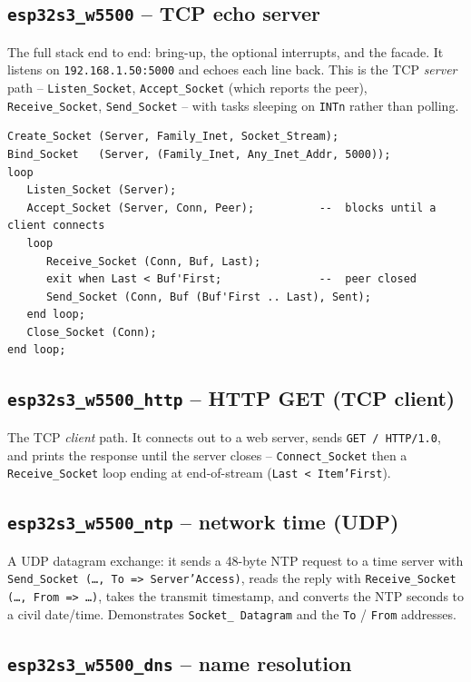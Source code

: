 \subsection{\texttt{esp32s3\_w5500} -- TCP echo server}

The full stack end to end: bring-up, the optional interrupts, and the facade. It
listens on \texttt{192.168.1.50:5000} and echoes each line back. This is the TCP
\emph{server} path -- \texttt{Listen\_Socket}, \texttt{Accept\_Socket} (which
reports the peer), \texttt{Receive\_Socket}, \texttt{Send\_Socket} -- with tasks
sleeping on \texttt{INTn} rather than polling.

\begin{lstlisting}
Create_Socket (Server, Family_Inet, Socket_Stream);
Bind_Socket   (Server, (Family_Inet, Any_Inet_Addr, 5000));
loop
   Listen_Socket (Server);
   Accept_Socket (Server, Conn, Peer);          --  blocks until a client connects
   loop
      Receive_Socket (Conn, Buf, Last);
      exit when Last < Buf'First;               --  peer closed
      Send_Socket (Conn, Buf (Buf'First .. Last), Sent);
   end loop;
   Close_Socket (Conn);
end loop;
\end{lstlisting}

\subsection{\texttt{esp32s3\_w5500\_http} -- HTTP GET (TCP client)}

The TCP \emph{client} path. It connects out to a web server, sends
\texttt{GET / HTTP/1.0}, and prints the response until the server closes --
\texttt{Connect\_Socket} then a \texttt{Receive\_Socket} loop ending at
end-of-stream (\texttt{Last < Item'First}).

\subsection{\texttt{esp32s3\_w5500\_ntp} -- network time (UDP)}

A UDP datagram exchange: it sends a 48-byte NTP request to a time server with
\texttt{Send\_Socket (\dots, To => Server'Access)}, reads the reply with
\texttt{Receive\_Socket (\dots, From => \dots)}, takes the transmit timestamp, and
converts the NTP seconds to a civil date/time. Demonstrates \texttt{Socket\_%
Datagram} and the \texttt{To} / \texttt{From} addresses.

\subsection{\texttt{esp32s3\_w5500\_dns} -- name resolution}

